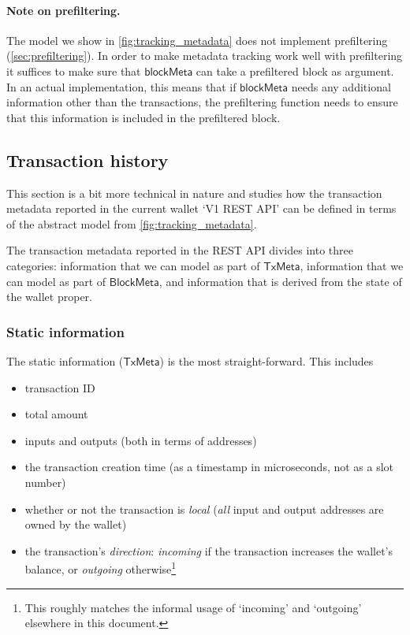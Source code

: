 \documentclass{article}
\theoremstyle{definition}{
  \newtheorem{lemma}{Lemma}[section] %
  \newtheorem{definition}[lemma]{Definition}
}
\theoremstyle{theorem}{
  \newtheorem{invariant}[lemma]{Invariant}
  \newtheorem{proofobligation}[lemma]{Proof Obligation}
}
\numberwithin{equation}{lemma}
\begin{document}
\paragraph{Note on prefiltering.} The model we show in
\cref{fig:tracking_metadata} does not implement prefiltering
(\cref{sec:prefiltering}). In order to make metadata tracking work well
with prefiltering it suffices to make sure that $\mathsf{blockMeta}$ can take a
prefiltered block as argument. In an actual implementation, this means that if
$\mathsf{blockMeta}$ needs any additional information other than the
transactions, the prefiltering function needs to ensure that this information
is included in the prefiltered block.

\subsection{Transaction history}
\label{sec:transaction_history}

This section is a bit more technical in nature and studies how the transaction
metadata reported in the current wallet `V1 REST API' can be defined in terms
of the abstract model from \cref{fig:tracking_metadata}.

The transaction metadata reported in the REST API divides into three categories:
information that we can model as part of $\mathsf{TxMeta}$, information that
we can model as part of $\mathsf{BlockMeta}$, and information that is derived
from the state of the wallet proper.

\subsubsection{Static information}

The static information ($\mathsf{TxMeta}$) is the most straight-forward.
This includes
%
\begin{itemize}
\item transaction ID
\item total amount
\item inputs and outputs (both in terms of addresses)
\item the transaction creation time
(as a timestamp in microseconds, not as a slot number)
\item whether or not the transaction is \emph{local}
(\emph{all} input and output addresses are owned by the wallet)
\item the transaction's \emph{direction}: \emph{incoming} if the transaction
increases the wallet's balance, or \emph{outgoing} otherwise\footnote{This
roughly matches the informal usage of `incoming' and `outgoing' elsewhere in
this document.}
\end{itemize}
\end{document}
